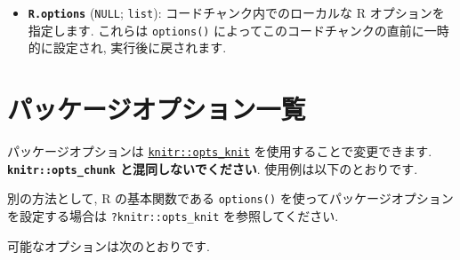 \documentclass[
  lualatex,ja=standard,jafont=noto-otf]{bxjsreport}
\newenvironment{Shaded}{\begin{snugshade}}{\end{snugshade}}
\newcommand{\AttributeTok}[1]{\textcolor[rgb]{0.13,0.29,0.53}{#1}}
\newcommand{\ConstantTok}[1]{\textcolor[rgb]{0.56,0.35,0.01}{#1}}
\newcommand{\FunctionTok}[1]{\textcolor[rgb]{0.13,0.29,0.53}{\textbf{#1}}}
\newcommand{\NormalTok}[1]{#1}
\newcommand{\SpecialCharTok}[1]{\textcolor[rgb]{0.81,0.36,0.00}{\textbf{#1}}}
\providecommand{\tightlist}{%
  \setlength{\itemsep}{0pt}\setlength{\parskip}{0pt}}
\begin{document}
\begin{itemize}
\tightlist
\item
  \textbf{\texttt{R.options}} (\texttt{NULL}; \texttt{list}):
  コードチャンク内でのローカルな R オプションを指定します. これらは
  \texttt{options()} によってこのコードチャンクの直前に一時的に設定され,
  実行後に戻されます.
\end{itemize}

\hypertarget{package-options}{%
\section{パッケージオプション一覧}\label{package-options}}

パッケージオプションは
\protect\hyperlink{objects}{\texttt{knitr::opts\_knit}}
を使用することで変更できます. \textbf{\texttt{knitr::opts\_chunk}
と混同しないでください}. 使用例は以下のとおりです.

\begin{Shaded}
\end{Shaded}

別の方法として, R の基本関数である \texttt{options()}
を使ってパッケージオプションを設定する場合は \texttt{?knitr::opts\_knit}
を参照してください.

可能なオプションは次のとおりです.
\end{document}
